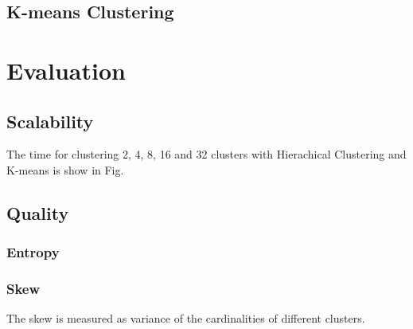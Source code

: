 \documentclass{article}
\begin{document}
\subsection{K-means Clustering}
\section{Evaluation}
\subsection{Scalability}
The time for clustering 2, 4, 8, 16 and 32 clusters with Hierachical Clustering and K-means is show in Fig. 
\subsection{Quality}
\subsubsection{Entropy}
\subsubsection{Skew}
The skew is measured as variance of the cardinalities of different clusters. 
\end{document}

